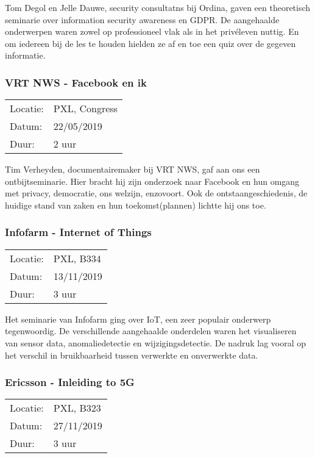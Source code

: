 Tom Degol en Jelle Dauwe, security consultatns bij Ordina, gaven een theoretisch seminarie over information security awareness en GDPR. De aangehaalde onderwerpen waren zowel op professioneel vlak als in het privéleven nuttig. En om iedereen bij de les te houden hielden ze af en toe een quiz over de gegeven informatie.

\subsubsection{VRT NWS - Facebook en ik}

\begin{tabular}{l l}
  Locatie: & PXL, Congress\\
  Datum: & 22/05/2019\\
  Duur: & 2 uur
\end{tabular}

Tim Verheyden, documentairemaker bij VRT NWS, gaf aan ons een ontbijtseminarie. Hier bracht hij zijn onderzoek naar Facebook en hun omgang met privacy, democratie, ons welzijn, enzovoort. Ook de ontstaangeschiedenis, de huidige stand van zaken en hun toekomst(plannen) lichtte hij ons toe.

\subsubsection{Infofarm - Internet of Things}

\begin{tabular}{l l}
  Locatie: & PXL, B334\\
  Datum: & 13/11/2019\\
  Duur: & 3 uur
\end{tabular}

Het seminarie van Infofarm ging over IoT, een zeer populair onderwerp tegenwoordig. De verschillende aangehaalde onderdelen waren het visualiseren van sensor data, anomaliedetectie en wijzigingsdetectie. De nadruk lag vooral op het verschil in bruikbaarheid tussen verwerkte en onverwerkte data.

\subsubsection{Ericsson - Inleiding to 5G}

\begin{tabular}{l l}
  Locatie: & PXL, B323\\
  Datum: & 27/11/2019\\
  Duur: & 3 uur
\end{tabular}

